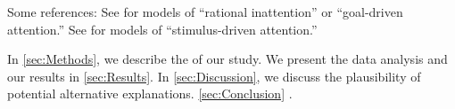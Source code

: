 \Blindtext[3]

Some references: See \cite{Sims2003, Gabaix2014} for models of ``rational inattention'' or ``goal-driven attention.'' See \cite{Bordalo2012, Bordalo2013, Koszegi2013, Taubinsky2014, Bushong2016} for models of ``stimulus-driven attention.''%

\blindmathtrue

\Blindtext[3]

In \autoref{sec:Methods}, we describe the  of our study. We present the data analysis and our results in \autoref{sec:Results}. In \autoref{sec:Discussion}, we discuss the plausibility of potential alternative explanations. \autoref{sec:Conclusion} .
